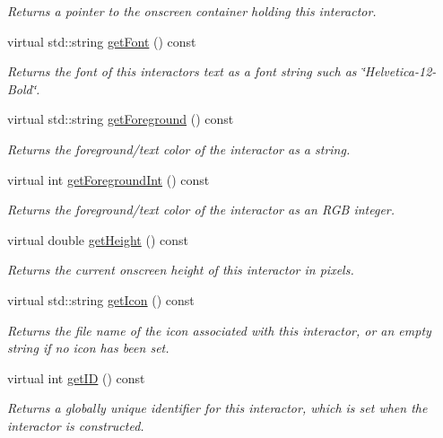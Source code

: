 \begin{DoxyCompactItemize}
\begin{DoxyCompactList}\small\item\em Returns a pointer to the onscreen container holding this interactor. \end{DoxyCompactList}\item 
virtual std\+::string \mbox{\hyperlink{classGInteractor_a894a5502900794eeb27d084c21f1d77d}{get\+Font}} () const
\begin{DoxyCompactList}\small\item\em Returns the font of this interactor\textquotesingle{}s text as a font string such as \char`\"{}\+Helvetica-\/12-\/\+Bold\char`\"{}. \end{DoxyCompactList}\item 
virtual std\+::string \mbox{\hyperlink{classGInteractor_a4fa2d8b0192a3a5b4af4bbfe71194d03}{get\+Foreground}} () const
\begin{DoxyCompactList}\small\item\em Returns the foreground/text color of the interactor as a string. \end{DoxyCompactList}\item 
virtual int \mbox{\hyperlink{classGInteractor_ac3b12ab385a6ef9ae90fc879860ba726}{get\+Foreground\+Int}} () const
\begin{DoxyCompactList}\small\item\em Returns the foreground/text color of the interactor as an R\+GB integer. \end{DoxyCompactList}\item 
virtual double \mbox{\hyperlink{classGInteractor_a1e7e353362434072875264cf95629f99}{get\+Height}} () const
\begin{DoxyCompactList}\small\item\em Returns the current onscreen height of this interactor in pixels. \end{DoxyCompactList}\item 
virtual std\+::string \mbox{\hyperlink{classGInteractor_aaed62a73004939a64da6f0eb9eb64d73}{get\+Icon}} () const
\begin{DoxyCompactList}\small\item\em Returns the file name of the icon associated with this interactor, or an empty string if no icon has been set. \end{DoxyCompactList}\item 
virtual int \mbox{\hyperlink{classGInteractor_a9c9659a6c6ba66b4107ba59c95a24241}{get\+ID}} () const
\begin{DoxyCompactList}\small\item\em Returns a globally unique identifier for this interactor, which is set when the interactor is constructed. \end{DoxyCompactList}\item 

\end{DoxyCompactItemize}
